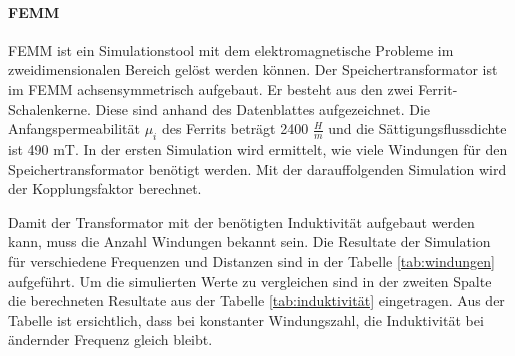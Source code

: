 \paragraph{FEMM}
FEMM ist ein Simulationstool mit dem elektromagnetische Probleme im zweidimensionalen Bereich gelöst werden können. Der Speichertransformator ist im FEMM achsensymmetrisch aufgebaut. Er besteht aus den zwei Ferrit-Schalenkerne. Diese sind anhand des Datenblattes aufgezeichnet. Die Anfangspermeabilität $ \mu_{i} $ des Ferrits beträgt 2400 $ \frac{H}{m} $ und die Sättigungsflussdichte ist 490 mT. In der ersten Simulation wird ermittelt, wie viele Windungen für den Speichertransformator benötigt werden. Mit der darauffolgenden Simulation wird der Kopplungsfaktor berechnet.

Damit der Transformator mit der benötigten Induktivität aufgebaut werden kann, muss die Anzahl Windungen bekannt sein. Die Resultate der Simulation für verschiedene Frequenzen und Distanzen sind in der Tabelle \ref{tab:windungen} aufgeführt. Um die simulierten Werte zu vergleichen sind in der zweiten Spalte die berechneten Resultate aus der Tabelle \ref{tab:induktivität} eingetragen. Aus der Tabelle ist ersichtlich, dass bei konstanter Windungszahl, die Induktivität bei ändernder Frequenz gleich bleibt.

